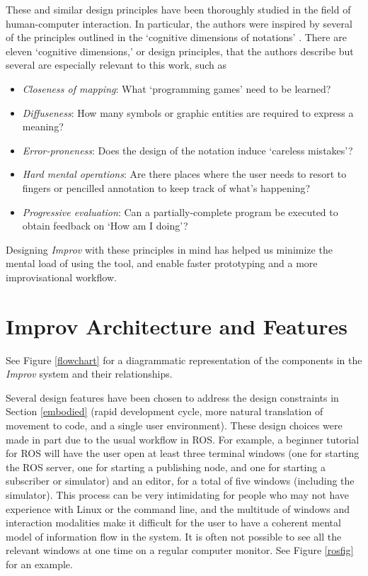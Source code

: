 \documentclass[sigconf]{acmart}
\begin{document}
These and similar design principles have been thoroughly studied in the field
of human-computer interaction. In particular, the authors were inspired by several of the principles
outlined in the `cognitive dimensions of notations' \cite{green1996usability}.
There are eleven `cognitive dimensions,' or design principles, that the authors
describe but several are especially relevant to this work, such as

\begin{itemize}
\item \emph{Closeness of mapping}: What `programming games' need to be learned?
\item \emph{Diffuseness}: How many symbols or graphic entities are required to express a meaning?
\item \emph{Error-proneness}: Does the design of the notation induce `careless mistakes'?
\item \emph{Hard mental operations}: Are there places where the user needs to resort to  fingers or pencilled annotation to keep track of what's happening?
\item \emph{Progressive evaluation}: Can a partially-complete program be executed to
obtain feedback on `How am I doing'?
\end{itemize}

Designing \emph{Improv} with these principles in mind has helped us minimize the mental
load of using the tool, and enable faster prototyping and a more
improvisational workflow.


\section{Improv Architecture and Features}\label{architecture-overview}

See Figure \ref{flowchart} for a diagrammatic representation of
the components in the \emph{Improv} system and their relationships.

Several design features have been chosen to
address the design constraints in Section \ref{embodied} (rapid development
cycle, more natural translation of movement to code, and a single user environment).
These design choices were made in part due to the usual workflow in ROS. For
example, a beginner tutorial for ROS will have the user open at least three
terminal windows (one for starting the ROS server, one for starting a
publishing node, and one for starting a subscriber or simulator) and an editor,
for a total of five windows (including the simulator). This process can be very
intimidating for people who may not have experience with Linux or the command
line, and the multitude of windows and interaction modalities make it difficult
for the user to have a coherent mental model of information flow in the system.
It is often not possible to see all the relevant windows at one time on a
regular computer monitor. See Figure \ref{rosfig} for an example.
\end{document}
